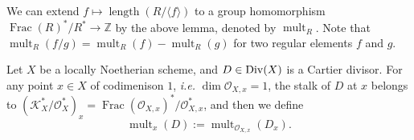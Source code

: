 We can extend $f\mapsto \operatorname{length}(R/\langle f\rangle)$ to a group 
homomorphism $\operatorname{Frac}(R)^*/R^*\to \mathbb Z$ by the above lemma, 
denoted by $\operatorname{mult}_R$. Note that $\operatorname{mult}_R(f/g)
=\operatorname{mult}_R(f)-\operatorname{mult}_R(g)$ for two regular elements $f$ and 
$g$.

Let $X$ be a locally Noetherian scheme, and $D\in \operatorname{Div}(X)$ is a Cartier divisor.
For any point $x\in X$ of codimenison $1$, \textit{i.e.} $\dim \mathcal O_{X,x}=1$,
the stalk of $D$ at $x$ belongs to $(\mathcal K^*_X/\mathcal O_X^*)_x=
\operatorname{Frac} (\mathcal O_{X,x})^*/\mathcal O_{X,x}^*$, and then we define
\[
	\operatorname{mult}_x(D):= \operatorname{mult}_{\mathcal O_{X,x}}(D_x).
\]
